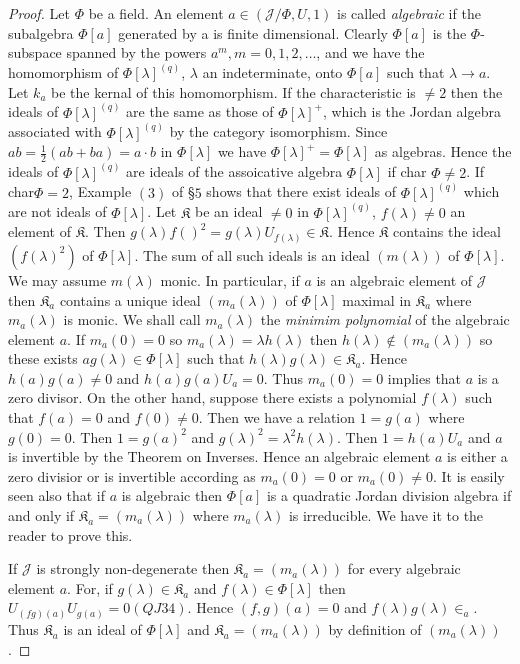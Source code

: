\begin{proof}
Let $\Phi$ be a field. An element $a\in (\mathscr{J}/\Phi, U,1)$
is called {\em algebraic} if the subalgebra $\Phi[a]$ generated by a
is finite dimensional. Clearly $\Phi[a]$ is the $\Phi$-subspace
spanned by the powers $a^{m},m=0,1,2,\ldots$, and we have the
homomorphism of $\Phi[\lambda]^{(q)}$, $\lambda$ an indeterminate,
onto $\Phi[a]$ such that $\lambda \to a $. Let $k_a$ be the kernal of
this homomorphism. If the characteristic is $\neq 2$ then the ideals
of $\Phi[\lambda]^{(q)}$ are the same as those of $\Phi[\lambda]^{+}$,
which is the Jordan algebra associated with $\Phi[\lambda]^{(q)}$ by
the category isomorphism. Since $ab=\frac{1}{2}(ab+ba)=a\cdot b$ in
$\Phi[\lambda]$ we have $\Phi[\lambda]^{+}=\Phi[\lambda]$ as
algebras. Hence the ideals of $\Phi[\lambda]^{(q)}$ are ideals of the
assoicative algebra $\Phi[\lambda]$ if char $\Phi\neq 2$. If
char\pageoriginale $\Phi=2$, Example $(3)$ of \S $5$ shows that there
exist ideals of $\Phi[\lambda]^{(q)}$ which are not ideals of
$\Phi[\lambda]$. Let $\mathfrak{K}$ be an ideal $\neq 0$ in
$\Phi[\lambda]^{(q)}$, $f(\lambda)\neq 0$ an element of
$\mathfrak{K}$. Then
$g(\lambda)f()^{2}=g(\lambda)U_{f(\lambda)}\in
\mathfrak{K}$. Hence $\mathfrak{K}$ contains the ideal
$(f(\lambda)^{2})$ of $\Phi[\lambda]$. The sum of all such ideals is
an ideal $(m(\lambda))$ of $\Phi[\lambda]$. We may assume $m(\lambda)$
monic. In particular, if $a$ is an algebraic element of $\mathscr{J}$
then $\mathfrak{K}_a$ contains a unique ideal $(m_a(\lambda))$ of
$\Phi[\lambda]$ maximal in $\mathfrak{K}_a$ where $m_a(\lambda)$ is
monic. We shall call $m_a(\lambda)$ the {\em minimim polynomial} of the
algebraic element $a$. If $m_a(0)=0$ so $m_a(\lambda)=\lambda
h(\lambda)$ then $h(\lambda)\notin(m_a(\lambda))$ so these exists $a
g(\lambda) \in \Phi [\lambda]$ such that
$h(\lambda)g(\lambda)\in \mathfrak{K}_a$. Hence $h(a)g(a)\neq 0$
and $h(a)g(a)U_a=0$. Thus $m_a(0)=0$ implies that $a$ is a zero
divisor. On the other hand, suppose there exists a polynomial
$f(\lambda)$ such that $f(a)=0$ and $f(0)\neq 0$. Then we have a
relation $1=g(a)$ where $g(0)=0$. Then $1=g(a)^{2}$ and
$g(\lambda)^{2}=\lambda^{2}h(\lambda)$. Then $1=h(a)U_a$ and $a$ is
invertible by the Theorem on Inverses. Hence an algebraic element $a$
is either a zero divisior or is invertible according as $m_a(0)=0$ or
$m_a(0)\neq 0$. It is easily seen also that if $a$ is algebraic then
$\Phi[a]$ is a quadratic Jordan division algebra if and only if
$\mathfrak{K}_a=(m_a(\lambda))$ where $m_a(\lambda)$ is
irreducible. We have it to the reader to prove this.

If $\mathscr{J}$ is strongly non-degenerate then
$\mathfrak{K}_a=(m_a(\lambda))$ for every algebraic element $a$. For,
if $g(\lambda)\in \mathfrak{K}_a$ and $f(\lambda)\in
\Phi[\lambda]$ then $U_{(fg)(a)}U_{g(a)}=0(QJ 34)$. Hence $(f,g)(a)=0$
and $f(\lambda)g(\lambda)\in_a$. Thus $\mathfrak{K}_a$ is an
ideal of $\Phi[\lambda]$ and $\mathfrak{K}_a=(m_a(\lambda))$ by
definition of $(m_a(\lambda))$.
\end{proof}

